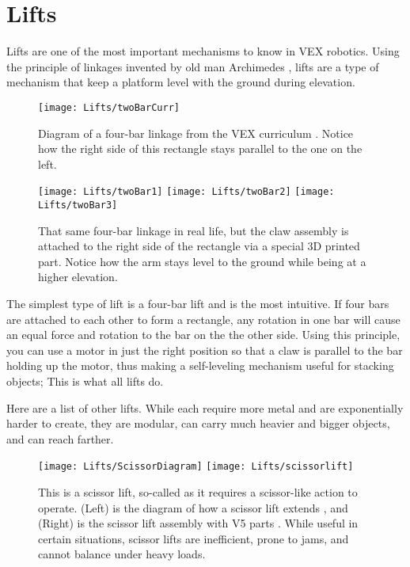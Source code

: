 \section{Lifts}

Lifts are one of the most important mechanisms to know in VEX robotics. Using the principle of linkages invented by old man Archimedes \cite{Linkage}, lifts are a type of mechanism that keep a platform level with the ground during elevation.

\begin{figure}[h]
    \centering
    \texttt{[image: Lifts/twoBarCurr]}
    \caption{
    Diagram of a four-bar linkage from the VEX curriculum \cite{LinkageCurr}. Notice how the right side of this rectangle stays parallel to the one on the left.
    }
\end{figure}

\begin{figure}[h]
    \centering
    \texttt{[image: Lifts/twoBar1]}
    \texttt{[image: Lifts/twoBar2]}
    \texttt{[image: Lifts/twoBar3]}
    \caption{
    That same four-bar linkage in real life, but the claw assembly is attached to the right side of the rectangle via a special 3D printed part. Notice how the arm stays level to the ground while being at a higher elevation.
    }
\end{figure}

The simplest type of lift is a four-bar lift and is the most intuitive. If four bars are attached to each other to form a rectangle, any rotation in one bar will cause an equal force and rotation to the bar on the the other side. Using this principle, you can use a motor in just the right position so that a claw is parallel to the bar holding up the motor, thus making a self-leveling mechanism useful for stacking objects; This is what all lifts do.

Here are a list of other lifts. While each require more metal and are exponentially harder to create, they are modular, can carry much heavier and bigger objects, and can reach farther.


\begin{figure}[h]
    \centering
    \texttt{[image: Lifts/ScissorDiagram]}
    \texttt{[image: Lifts/scissorlift]}
    \caption{
    This is a scissor lift, so-called as it requires a scissor-like action to operate. (Left) is the diagram of how a scissor lift extends \cite{ScissorDiagram}, and (Right) is the scissor lift assembly with V5 parts \cite{V5Lifts}. While useful in certain situations, scissor lifts are inefficient, prone to jams, and cannot balance under heavy loads.
    }
\end{figure}


